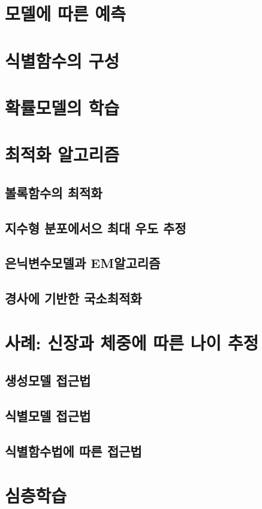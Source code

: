\documentclass[../main.tex]{subfiles}
\begin{document}
\section{모델에 따른 예측}

\section{식별함수의 구성}

\section{확률모델의 학습}

\section{최적화 알고리즘}
\subsection{볼록함수의 최적화}
\subsection{지수형 분포에서으 최대 우도 추정}
\subsection{은닉변수모델과 EM알고리즘}
\subsection{경사에 기반한 국소최적화}

\section{사례: 신장과 체중에 따른 나이 추정}
\subsection{생성모델 접근법}
\subsection{식별모델 접근법}
\subsection{식별함수법에 따른 접근법}

\section{심층학습}
\end{document}

